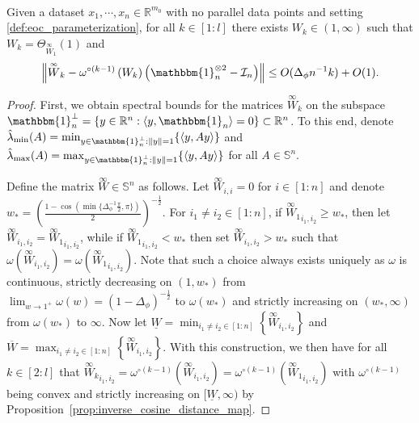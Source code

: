 \documentclass[twoside,11pt]{article}
\newcommand{\R}{\mathbb{R}}
\newcommand{\Id}{\mathcal{I}}
\newcommand{\limiting}[1]{\overset{\scriptscriptstyle\infty}{#1}}
\begin{document}
\begin{proposition}\label{prop:inverse_cosine_distance_matrices}~\\
Given a dataset $x_1,\cdots,x_n \in \R^{m_0}$ with no parallel data points and setting \eqref{def:eoc_parameterization}, for all $k \in [1:l]$ there exists $W_k \in (1,\infty)$ such that $W_k = \Theta_{\limiting{W}_1}(1)$ and
\[
\left\Vert \limiting{W}_k - \omega^{\circ (k-1)}\left( W_k \right) \left( \mathbbm{1}_n^{\otimes 2} - \Id_n \right) \right\Vert \leq O(\Delta_\phi n^{-1} k) + O(1).
\]
\end{proposition}
\begin{proof}
First, we obtain spectral bounds for the matrices $\limiting{W}_k$ on the subspace $\mathbbm{1}_n^{\perp} = \{ y \in \R^n : \langle y, \mathbbm{1}_n \rangle = 0 \} \subset \R^n$. To this end, denote $\hat{\lambda}_{\min}(A) = \min_{y \in \mathbbm{1}_n^{\perp} : \Vert y \Vert = 1}\{ \langle y, A y \rangle \}$ and $\hat{\lambda}_{\max}(A) = \max_{y \in \mathbbm{1}_n^{\perp} : \Vert y \Vert = 1}\{ \langle y, A y \rangle \}$ for all $A \in \mathbb{S}^n$.

Define the matrix $\limiting{W} \in \mathbb{S}^n$ as follows. Let $\limiting{W}_{i,i} = 0$ for $i \in [1:n]$ and denote $w_* = (\frac{1-\cos(\min\{ \Delta_\phi^{-1} \frac{\pi}{2}, \pi\})}{2})^{-\frac{1}{2}}$. For $i_1 \neq i_2 \in [1:n]$, if ${\limiting{W}_1}_{i_1,i_2} \geq w_*$, then let $\limiting{W}_{i_1,i_2} = {\limiting{W}_1}_{i_1,i_2}$, while if ${\limiting{W}_1}_{i_1,i_2} < w_*$ then set $\limiting{W}_{i_1,i_2} > w_*$ such that $\omega(\limiting{W}_{i_1,i_2}) = \omega({\limiting{W}_1}_{i_1,i_2})$. Note that such a choice always exists uniquely as $\omega$ is continuous, strictly decreasing on $(1,w_*)$ from $\lim_{w \to 1^+} \omega(w) = (1-\Delta_\phi)^{-\frac{1}{2}}$ to $\omega(w_*)$ and strictly increasing on $(w_*,\infty)$ from $\omega(w_*)$ to $\infty$. Now let $\underline{W} = \min_{i_1 \neq i_2 \in [1:n]}\left\{ \limiting{W}_{i_1,i_2} \right\}$ and $\overline{W} = \max_{i_1 \neq i_2 \in [1:n]}\left\{ \limiting{W}_{i_1,i_2} \right\}$. With this construction, we then have for all $k \in [2:l]$ that ${\limiting{W}_k}_{i_1,i_2} = \omega^{\circ (k-1)}(\limiting{W}_{i_1,i_2}) = \omega^{\circ (k-1)}({\limiting{W}_1}_{i_1,i_2})$ with $\omega^{\circ (k-1)}$ being convex and strictly increasing on $[\underline{W},\infty)$ by Proposition~\ref{prop:inverse_cosine_distance_map}.


\end{proof}
\end{document}
